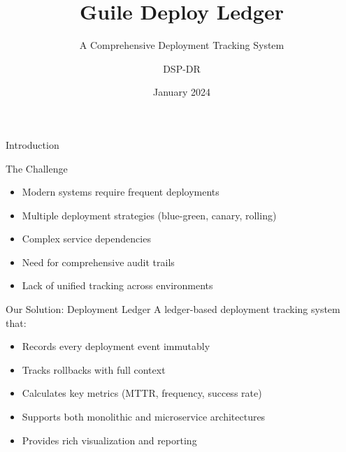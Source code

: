 \documentclass[presentation,aspectratio=169]{beamer}
\author{DSP-DR}
\date{January 2024}
\title{Guile Deploy Ledger}
\subtitle{A Comprehensive Deployment Tracking System}
\begin{document}
\maketitle
\begin{frame}[label={sec:org71f3a1d}]{Introduction}
\begin{block}{The Challenge}
\begin{itemize}[<+->]
\item Modern systems require frequent deployments
\item Multiple deployment strategies (blue-green, canary, rolling)
\item Complex service dependencies
\item Need for comprehensive audit trails
\item Lack of unified tracking across environments
\end{itemize}
\end{block}
\begin{block}{Our Solution: Deployment Ledger}
A \alert{ledger-based} deployment tracking system that:

\begin{itemize}[<+->]
\item Records every deployment event immutably
\item Tracks rollbacks with full context
\item Calculates key metrics (MTTR, frequency, success rate)
\item Supports both monolithic and microservice architectures
\item Provides rich visualization and reporting
\end{itemize}
\end{block}
\end{frame}
\end{document}
